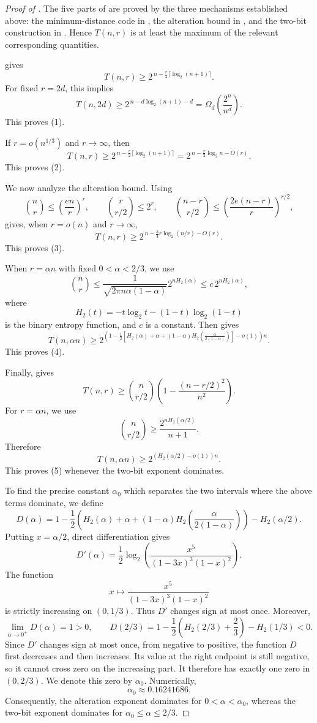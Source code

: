 \documentclass[11pt]{article}
\theoremstyle{plain}
\begin{document}
\begin{proof}[Proof of ]
The five parts of  are proved by the three mechanisms established above: the minimum-distance code in , the alteration bound in , and the two-bit construction in .
Hence $T(n,r)$ is at least the maximum of the relevant corresponding quantities.

 gives
\[
T(n,r)\ge 2^{\,n-\frac r2\lceil \log_2(n+1)\rceil}.
\]
For fixed $r=2d$, this implies
\[
T(n,2d)
\ge 2^{\,n-d\log_2(n+1)-d}
=
\Omega_d\!\left(\frac{2^n}{n^d}\right).
\]
This proves (1).

If $r=o(n^{1/3})$ and $r\to\infty$, then
\[
T(n,r)\ge 2^{\,n-\frac r2\lceil \log_2(n+1)\rceil}
       =2^{\,n-\frac r2\log_2 n-O(r)}.
\]
This proves (2).

We now analyze the alteration bound.
Using
\[
\binom{n}{r}\le \left(\frac{en}{r}\right)^r,
\qquad
\binom{r}{r/2}\le 2^r,
\qquad
\binom{n-r}{r/2}\le \left(\frac{2e(n-r)}{r}\right)^{r/2},
\]
 gives, when $r=o(n)$ and $r\to\infty$,
\[
T(n,r)
\ge
2^{\,n-\frac{3}{4}r\log_2(n/r)-O(r)}.
\]
This proves (3).

When $r=\alpha n$ with fixed $0<\alpha<2/3$, we use
\[
\binom{n}{r}
\le
\frac{1}{\sqrt{2\pi n\alpha(1-\alpha)}}2^{nH_2(\alpha)}
\le
c\,2^{nH_2(\alpha)},
\]
where
\[
H_2(t)=-t\log_2 t-(1-t)\log_2(1-t)
\]
is the binary entropy function, and $c$ is a constant.
Then  gives
\[
T(n,\alpha n)
\ge
2^{\left(
1-\frac12\left[
H_2(\alpha)+\alpha+(1-\alpha)H_2\!\left(\frac{\alpha}{2(1-\alpha)}\right)
\right]
-o(1)\right)n}.
\]
This proves (4).

Finally,  gives
\[
T(n,r)
\ge
\binom{n}{r/2}\left(1-\frac{(n-r/2)^2}{n^2}\right).
\]
For $r=\alpha n$, we use
\[
\binom{n}{r/2}
\ge
\frac{2^{nH_2(\alpha/2)}}{n+1}.
\]
Therefore
\[
T(n,\alpha n)\ge 2^{(H_2(\alpha/2)-o(1))n}.
\]
This proves (5) whenever the two-bit exponent dominates.

To find the precise constant $\alpha_0$ which separates the two intervals where the above terms dominate, we define
\[
D(\alpha)
=
1-\frac12\left(
H_2(\alpha)+\alpha
+(1-\alpha)H_2\!\left(\frac{\alpha}{2(1-\alpha)}\right)
\right)
-H_2(\alpha/2).
\]
Putting $x=\alpha/2$, direct differentiation gives
\[
D'(\alpha)
=
\frac12\log_2\left(
\frac{x^5}{(1-3x)^3(1-x)^2}
\right).
\]
The function
\[
x\longmapsto
\frac{x^5}{(1-3x)^3(1-x)^2}
\]
is strictly increasing on $(0,1/3)$. Thus $D'$ changes sign at
most once. 
Moreover,
\[
\lim_{\alpha\to0^+}D(\alpha)=1>0,
\qquad
D(2/3)
=
1-\frac12\left(H_2(2/3)+\frac23\right)
-H_2(1/3)
<0.
\]
Since $D'$ changes sign at most once, from negative to positive,
the function $D$ first decreases and then increases. Its value at
the right endpoint is still negative, so it cannot cross zero on
the increasing part. It therefore has exactly one zero in
$(0,2/3)$.
We denote this zero by
$\alpha_0$. Numerically,
\[
\alpha_0\approx0.16241686.
\]
Consequently, the alteration exponent dominates for
$0<\alpha<\alpha_0$, whereas the two-bit exponent dominates for
$\alpha_0\le\alpha\le2/3$.

\end{proof}
\end{document}
